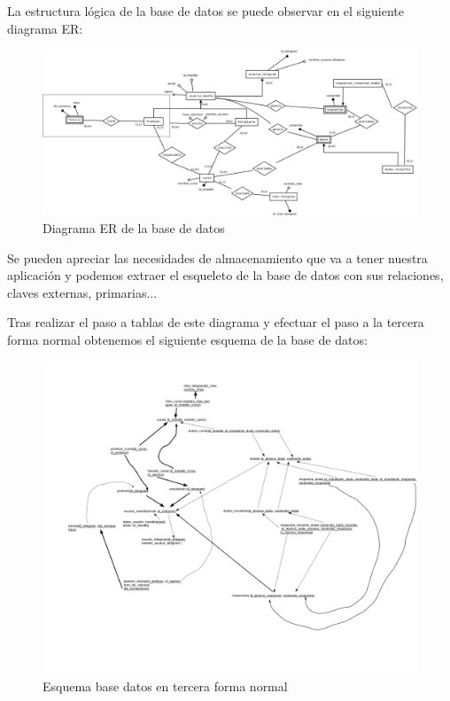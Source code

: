 La estructura lógica de la base de datos se puede observar en el siguiente diagrama ER:

\begin{figure}[H] %
\centering
\includegraphics[scale=0.2]{imagenes/diagramas/base_datos/ER.png}  %

\caption{Diagrama ER de la base de datos }\label{figura520}
\end{figure}
Se pueden apreciar las necesidades de almacenamiento que va a tener nuestra aplicación y podemos extraer el esqueleto de la base de datos con sus relaciones, claves externas, primarias... \par
Tras realizar el paso a tablas de este diagrama y efectuar el paso a la tercera forma normal obtenemos el siguiente esquema de la base de datos:


 \begin{figure}[H] %
\includegraphics[width=1.2\textwidth, right]{imagenes/diagramas/base_datos/esquema_tablas_normalizadafn3.png}  %
\caption{Esquema base datos en tercera forma normal}\label{figura5211}
\end{figure}



